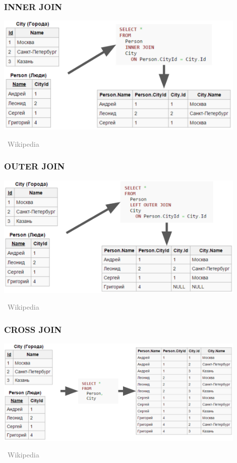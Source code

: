 \documentclass[xetex,mathserif,serif]{beamer}
\newcommand{\attribution}[1] {
\vspace{-5mm}\begin{flushright}\begin{scriptsize}\textcolor{gray}{\textcopyright\, #1}\end{scriptsize}\end{flushright}
}
\begin{document}
	\begin{frame}
		\frametitle{INNER JOIN}
		\begin{center}
			\includegraphics[width=0.9\textwidth]{innerJoin.png}
			\attribution{Wikipedia}
		\end{center}
	\end{frame}

	\begin{frame}
		\frametitle{OUTER JOIN}
		\begin{center}
			\includegraphics[width=0.9\textwidth]{outerJoin.png}
			\attribution{Wikipedia}
		\end{center}
	\end{frame}

	\begin{frame}
		\frametitle{CROSS JOIN}
		\begin{center}
			\includegraphics[width=0.9\textwidth]{crossJoin.png}
			\attribution{Wikipedia}
		\end{center}
	\end{frame}
\end{document}
